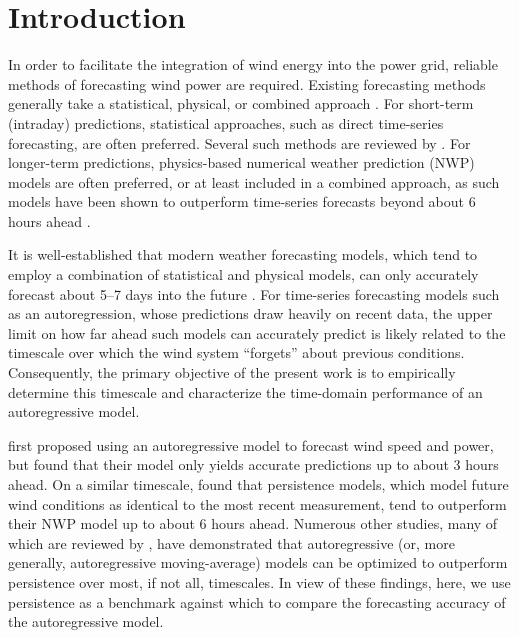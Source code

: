 \documentclass[11pt, oneside]{article}
\begin{document}

\newpage
\pagestyle{pages}
\section{Introduction}
In order to facilitate the integration of wind energy into the power grid, reliable methods of forecasting wind power are required.
Existing forecasting methods generally take a statistical, physical, or combined approach \citep{Wang2011}.
For short-term (intraday) predictions, statistical approaches, such as direct time-series forecasting, are often preferred.
Several such methods are reviewed by \citet[Chap.~2]{Giebel2011}.
For longer-term predictions, physics-based numerical weather prediction (NWP) models are often preferred, or at least included in a combined approach, as such models have been shown to outperform time-series forecasts beyond about 6 hours ahead \citep[Sec.~1.3]{Giebel2011}.

It is well-established that modern weather forecasting models, which tend to employ a combination of statistical and physical models, can only accurately forecast about 5--7 days into the future \citep[Sec.~1.2]{Giebel2011}.
For time-series forecasting models such as an autoregression, whose predictions draw heavily on recent data, the upper limit on how far ahead such models can accurately predict is likely related to the timescale over which the wind system ``forgets'' about previous conditions.
Consequently, the primary objective of the present work is to empirically determine this timescale and characterize the time-domain performance of an autoregressive model.

\citet{Brown1984} first proposed using an autoregressive model to forecast wind speed and power, but found that their model only yields accurate predictions up to about 3 hours ahead.
On a similar timescale, \citet{LandbergWatson1994} found that persistence models, which model future wind conditions as identical to the most recent measurement, tend to outperform their NWP model up to about 6 hours ahead.
Numerous other studies, many of which are reviewed by \citet[Sec.~2.1]{Giebel2011}, have demonstrated that autoregressive (or, more generally, autoregressive moving-average) models can be optimized to outperform persistence over most, if not all, timescales.
In view of these findings, here, we use persistence as a benchmark against which to compare the forecasting accuracy of the autoregressive model.
\end{document}
